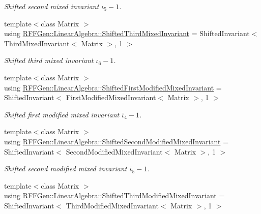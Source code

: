 \begin{DoxyCompactItemize}
\begin{DoxyCompactList}\small\item\em Shifted second mixed invariant $ \iota_5 - 1 $. \end{DoxyCompactList}\item 
\hypertarget{group__LinearAlgebraGroup_ga5923cfb191178d5edacef49c687462ae}{{\footnotesize template$<$class Matrix $>$ }\\using \hyperlink{group__LinearAlgebraGroup_ga5923cfb191178d5edacef49c687462ae}{R\-F\-F\-Gen\-::\-Linear\-Algebra\-::\-Shifted\-Third\-Mixed\-Invariant} = Shifted\-Invariant$<$ Third\-Mixed\-Invariant$<$ Matrix $>$, 1 $>$}\label{group__LinearAlgebraGroup_ga5923cfb191178d5edacef49c687462ae}

\begin{DoxyCompactList}\small\item\em Shifted third mixed invariant $ \iota_6 - 1 $. \end{DoxyCompactList}\item 
\hypertarget{group__LinearAlgebraGroup_ga55cd39bf5ba0bab6af5f0a1d26a040e4}{{\footnotesize template$<$class Matrix $>$ }\\using \hyperlink{group__LinearAlgebraGroup_ga55cd39bf5ba0bab6af5f0a1d26a040e4}{R\-F\-F\-Gen\-::\-Linear\-Algebra\-::\-Shifted\-First\-Modified\-Mixed\-Invariant} = Shifted\-Invariant$<$ First\-Modified\-Mixed\-Invariant$<$ Matrix $>$, 1 $>$}\label{group__LinearAlgebraGroup_ga55cd39bf5ba0bab6af5f0a1d26a040e4}

\begin{DoxyCompactList}\small\item\em Shifted first modified mixed invariant $ \bar\iota_4 - 1 $. \end{DoxyCompactList}\item 
\hypertarget{group__LinearAlgebraGroup_ga9934f120b3c3db724c2216d2aca90cd1}{{\footnotesize template$<$class Matrix $>$ }\\using \hyperlink{group__LinearAlgebraGroup_ga9934f120b3c3db724c2216d2aca90cd1}{R\-F\-F\-Gen\-::\-Linear\-Algebra\-::\-Shifted\-Second\-Modified\-Mixed\-Invariant} = Shifted\-Invariant$<$ Second\-Modified\-Mixed\-Invariant$<$ Matrix $>$, 1 $>$}\label{group__LinearAlgebraGroup_ga9934f120b3c3db724c2216d2aca90cd1}

\begin{DoxyCompactList}\small\item\em Shifted second modified mixed invariant $ \bar\iota_5 - 1 $. \end{DoxyCompactList}\item 
\hypertarget{group__LinearAlgebraGroup_ga5b8725e66f697bd26179ea888e75a84e}{{\footnotesize template$<$class Matrix $>$ }\\using \hyperlink{group__LinearAlgebraGroup_ga5b8725e66f697bd26179ea888e75a84e}{R\-F\-F\-Gen\-::\-Linear\-Algebra\-::\-Shifted\-Third\-Modified\-Mixed\-Invariant} = Shifted\-Invariant$<$ Third\-Modified\-Mixed\-Invariant$<$ Matrix $>$, 1 $>$}\label{group__LinearAlgebraGroup_ga5b8725e66f697bd26179ea888e75a84e}


\end{DoxyCompactItemize}
